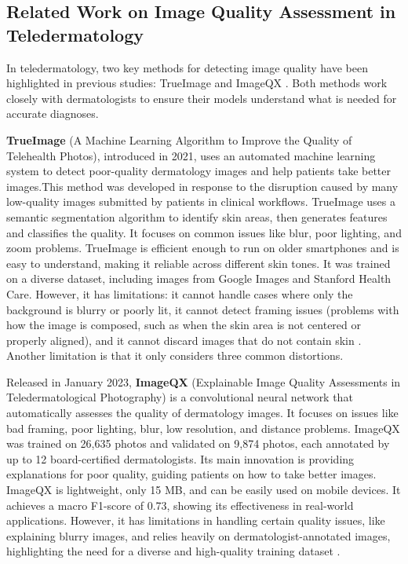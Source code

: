 \subsection{Related Work on Image Quality Assessment in Teledermatology}
\label{sub:ApproachesIQAinTeledermatology}
In teledermatology, two key methods for detecting image quality have been highlighted in previous studies: TrueImage \autocite{TrueImage} and ImageQX \autocite{ImageQX}. Both methods work closely with dermatologists to ensure their models understand what is needed for accurate diagnoses. \par
\vspace{\baselineskip}
\noindent
\textbf{TrueImage} (A Machine Learning Algorithm to Improve the Quality of Telehealth Photos), introduced in 2021, uses an automated machine learning system to detect poor-quality dermatology images and help patients take better images.This method was developed in response to the disruption caused by many low-quality images submitted by patients in clinical workflows. TrueImage uses a semantic segmentation algorithm to identify skin areas, then generates features and classifies the quality. It focuses on common issues like blur, poor lighting, and zoom problems. TrueImage is efficient enough to run on older smartphones and is easy to understand, making it reliable across different skin tones. It was trained on a diverse dataset, including images from Google Images and Stanford Health Care. However, it has limitations: it cannot handle cases where only the background is blurry or poorly lit, it cannot detect framing issues (problems with how the image is composed, such as when the skin area is not centered or properly aligned), and it cannot discard images that do not contain skin \autocite{TrueImage}. Another limitation is that it only considers three common distortions. \par
\vspace{\baselineskip}
\noindent
Released in January 2023, \textbf{ImageQX} (Explainable Image Quality Assessments in Teledermatological Photography)
is a convolutional neural network that automatically assesses the quality of dermatology images. It focuses on issues like bad framing, poor lighting, blur, low resolution, and distance problems. ImageQX was trained on 26,635 photos and validated on 9,874 photos, each annotated by up to 12 board-certified dermatologists. Its main innovation is providing explanations for poor quality, guiding patients on how to take better images. ImageQX is lightweight, only 15 MB, and can be easily used on mobile devices. It achieves a macro F1-score of 0.73, showing its effectiveness in real-world applications.  However, it has limitations in handling certain quality issues, like explaining blurry images, and relies heavily on dermatologist-annotated images, highlighting the need for a diverse and high-quality training dataset \autocite{ImageQX}.
